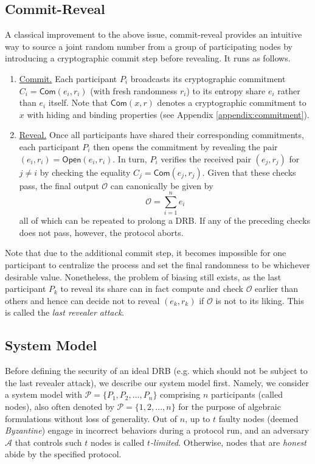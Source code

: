 \documentclass[letterpaper,twocolumn,10pt]{article}
\theoremstyle{definition}
\theoremstyle{remark}
\begin{document}
\subsection{Commit-Reveal}
\label{subsection:commit-reveal}
A classical improvement to the above issue, commit-reveal provides an intuitive way to source a joint random number from a group of participating nodes by introducing a cryptographic commit step before revealing. It runs as follows.
\begin{enumerate}
\item \underline{Commit.} Each participant $P_i$ broadcasts its cryptographic commitment $C_i = \mathsf{Com}(e_i, r_i)$ (with fresh randomness $r_i$) to its entropy share $e_i$ rather than $e_i$ itself. Note that $\mathsf{Com}(x, r)$ denotes a cryptographic commitment to $x$ with hiding and binding properties (see Appendix \ref{appendix:commitment}).
\item \underline{Reveal.} Once all participants have shared their corresponding commitments, each participant $P_i$ then opens the commitment by revealing the pair $(e_i, r_i) = \mathsf{Open}(e_i, r_i)$. In turn, $P_i$ verifies the received pair $(e_j, r_j)$ for $j \neq i$ by checking the equality $C_j = \mathsf{Com}(e_j, r_j)$. Given that these checks pass, the final output $\mathcal{O}$ can canonically be given by
\[
\mathcal{O} = \sum_{i = 1}^n e_i
\]
all of which can be repeated to prolong a DRB. If any of the preceding checks does not pass, however, the protocol aborts.
\end{enumerate}

Note that due to the additional commit step, it becomes impossible for one participant to centralize the process and set the final randomness to be whichever desirable value. Nonetheless, the problem of biasing still exists, as the last participant $P_k$ to reveal its share can in fact compute and check $\mathcal{O}$ earlier than others and hence can decide not to reveal $(e_k, r_k)$ if $\mathcal{O}$ is not to its liking. This is called the \textit{last revealer attack}.

\subsection{System Model}
Before defining the security of an ideal DRB (e.g. which should not be subject to the last revealer attack), we describe our system model first. Namely, we consider a system model with $\mathcal{P} = \{P_1, P_2, ..., P_n\}$ comprising $n$ participants (called nodes), also often denoted by $\mathcal{P} = \{1, 2, ..., n\}$ for the purpose of algebraic formulations without loss of generality. Out of $n$, up to $t$ faulty nodes (deemed \textit{Byzantine}) engage in incorrect behaviors during a protocol run, and an adversary $\mathcal{A}$ that controls such $t$ nodes is called \textit{$t$-limited}. Otherwise, nodes that are \textit{honest} abide by the specified protocol.
\end{document}
